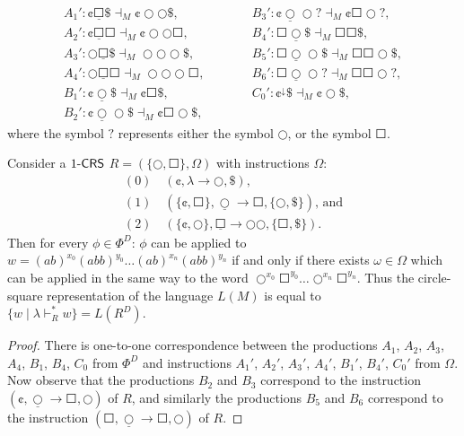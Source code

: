 $$
\begin{array}{ll}
A_1': \cent \underline{\Square} \$ \dashv_M \cent \Circle \Circle \$,\hspace{5em}    & B_3': \cent \underline{\Circle} \Circle ? \dashv_M \cent \Square \Circle ?,\\
A_2': \cent \underline{\Square} \Square \dashv_M \cent \Circle \Circle \Square,      & B_4': \Square \underline{\Circle} \$ \dashv_M \Square \Square \$, \\
A_3': \Circle \underline{\Square} \$ \dashv_M \Circle \Circle \Circle \$ ,           & B_5': \Square \underline{\Circle} \Circle \$ \dashv_M \Square \Square \Circle \$, \\
A_4': \Circle \underline{\Square} \Square \dashv_M \Circle \Circle \Circle \Square,  & B_6': \Square \underline{\Circle} \Circle ? \dashv_M \Square \Square \Circle ?,\\
B_1': \cent \underline{\Circle} \$ \dashv_M \cent \Square \$,                        & C_0': \cent ^\downarrow \$ \dashv_M \cent \Circle \$ ,\\
B_2': \cent \underline{\Circle} \Circle \$ \dashv_M \cent \Square \Circle \$,
\end{array}
$$
where the symbol $?$ represents either the symbol $\Circle$, or the symbol $\Square$.

\begin{lemma}
Consider a $\kCRS[1]$ $R = (\{\Circle, \Square\}, \Omega)$ with instructions $\Omega$:
$$\begin{array}{l}
(0) \quad (\cent, \lambda \to \Circle, \$),\\
(1) \quad (\{\cent, \Square\}, \underline{\Circle} \to \Square, \{\Circle, \$\}) \text{, and}\\
(2) \quad (\{\cent, \Circle\}, \underline{\Square} \to \Circle \Circle, \{\Square, \$\}).
\end{array}
$$
Then for every $\phi \in \Phi^D$: $\phi$ can be applied to $w = (ab)^{x_0}(abb)^{y_0} \ldots (ab)^{x_n}(abb)^{y_n}$ if and only if there exists $\omega \in \Omega$ which can be applied in the same way to the word $\Circle^{x_0} \Square^{y_0} \ldots \Circle^{x_n} \Square^{y_n}$. Thus the circle-square representation of the language $L(M)$ is equal to $\{ w \mid \lambda \vdash_R^* w \} = L(R^D)$.
\end{lemma}

\begin{proof}
There is one-to-one correspondence between the productions $A_1$, $A_2$, $A_3$, $A_4$, $B_1$, $B_4$, $C_0$ from $\Phi^D$ and instructions $A_1'$, $A_2'$, $A_3'$, $A_4'$, $B_1'$, $B_4'$, $C_0'$ from $\Omega$. Now observe that the productions $B_2$ and $B_3$ correspond to the instruction $(\cent, \underline{\Circle} \to \Square, \Circle)$ of $R$, and similarly the productions $B_5$ and $B_6$ correspond to the instruction $(\Square, \underline{\Circle} \to \Square, \Circle)$ of $R$.
\end{proof}

